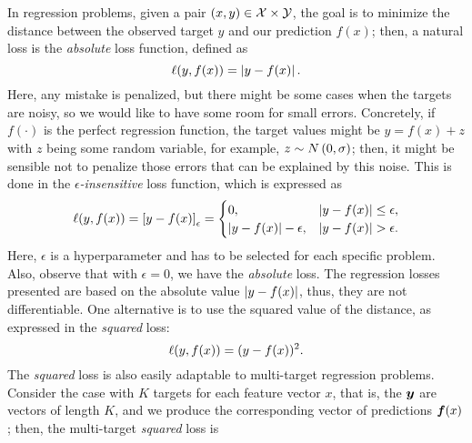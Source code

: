 In regression problems, given a pair $(x, y) \in \mathcal{X} \times \mathcal{Y}$, the goal is to minimize the distance between the observed target $y$ and our prediction $f(x)$; then, a natural loss is the \emph{absolute} loss function, defined as 
\begin{equation}
    \label{eq:abs_def}
    \lossf(y, f(x)) = \abs{y - f(x)}.
\end{equation}
Here, any mistake is penalized, but there might be some cases when the targets are noisy, so we would like to have some room for small errors. Concretely, if $f(\cdot)$ is the perfect regression function, the target values might be $y = f(x) + z$ with $z$ being some random variable, for example, $z \sim N \left(0, \sigma\right)$; then, it might be sensible not to penalize those errors that can be explained by this noise. This is done in the \emph{$\epsilon$-insensitive} loss function, which is expressed as 
\begin{equation}
    \label{eq:epsins_def}
    \lossf(y, f(x)) =  \epsins{y - f(x)} =
    \begin{cases}
        0, & \abs{y - f(x)} \leq \epsilon ,\\
        \abs{y - f(x)} - \epsilon, & \abs{y - f(x)} > \epsilon .\\
    \end{cases}
\end{equation} 
Here, $\epsilon$ is a hyperparameter and has to be selected for each specific problem. Also, observe that with $\epsilon =0$, we have the \emph{absolute} loss.
%
The regression losses presented are based on the absolute value $\left|y - f(x)\right|$, thus, they are not differentiable. One alternative is to use the squared value of the distance, as expressed in the \emph{squared} loss:
\begin{equation}
    \label{eq:sq_def}
    \lossf(y, f(x)) = (y - f(x))^2.
\end{equation}
The \emph{squared} loss is also easily adaptable to multi-target regression problems. Consider the case with $K$ targets for each feature vector $x$, that is, the $\bm{y}$ are vectors of length $K$, and we produce the corresponding vector of predictions $\bm{f}(x)$; then, the multi-target \emph{squared} loss is
